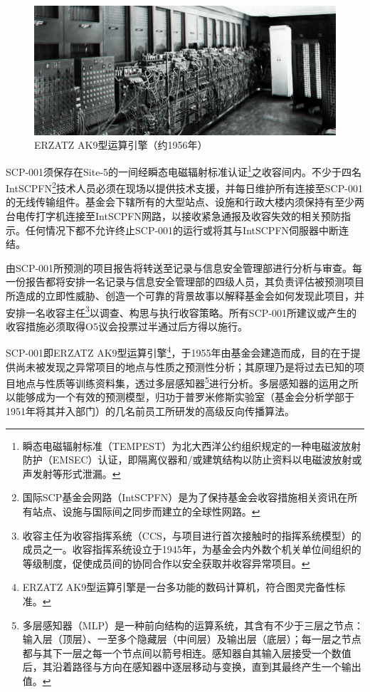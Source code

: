 \hr



\hr

\begin{figure}[H]
    \centering
    \includegraphics[width=\linewidth]{images/SCP-001-a-good-boy-2.png}
    \caption*{ERZATZ AK9型运算引擎（约1956年）}
\end{figure}

\hr

 SCP-001须保存在Site-5的一间经瞬态电磁辐射标准认证\footnote{瞬态电磁辐射标准（TEMPEST）为北大西洋公约组织规定的一种电磁波放射防护（EMSEC）认证，即隔离仪器和\slash 或建筑结构以防止资料以电磁波放射或声发射等形式泄漏。}之收容间内。不少于四名IntSCPFN\footnote{国际SCP基金会网路（IntSCPFN）是为了保持基金会收容措施相关资讯在所有站点、设施与国际间之同步而建立的全球性网路。}技术人员必须在现场以提供技术支援，并每日维护所有连接至SCP-001的无线传输组件。基金会下辖所有的大型站点、设施和行政大楼内须保持有至少两台电传打字机连接至IntSCPFN网路，以接收紧急通报及收容失效的相关预防指示。任何情况下都不允许终止SCP-001的运行或将其与IntSCPFN伺服器中断连结。

由SCP-001所预测的项目报告将转送至记录与信息安全管理部进行分析与审查。每一份报告都将安排一名记录与信息安全管理部的四级人员，其负责评估被预测项目所造成的立即性威胁、创造一个可靠的背景故事以解释基金会如何发现此项目，并安排一名收容主任\footnote{收容主任为收容指挥系统（CCS，与项目进行首次接触时的指挥系统模型）的成员之一。收容指挥系统设立于1945年，为基金会内外数个机关单位间组织的等级制度，促使成员间的协同合作以安全获取并收容异常项目。}以调查、构思与执行收容策略。所有SCP-001所建议或产生的收容措施必须取得O5议会投票过半通过后方得以施行。

 SCP-001即ERZATZ AK9型运算引擎\footnote{ERZATZ AK9型运算引擎是一台多功能的数码计算机，符合图灵完备性标准。}，于1955年由基金会建造而成，目的在于提供尚未被发现之异常项目的地点与性质之预测性分析；其原理乃是将过去已知的项目地点与性质等训练资料集，透过多层感知器\footnote{多层感知器（MLP）是一种前向结构的运算系统，其含有不少于三层之节点：输入层（顶层）、一至多个隐藏层（中间层）及输出层（底层）；每一层之节点都与其下一层之每一个节点间以箭号相连。感知器自其输入层接受一个数值后，其沿着路径与方向在感知器中逐层移动与变换，直到其最终产生一个输出值。}进行分析。多层感知器的运用之所以能够成为一个有效的预测模型，归功于普罗米修斯实验室（基金会分析学部于1951年将其并入部门）的几名前员工所研发的高级反向传播算法。

